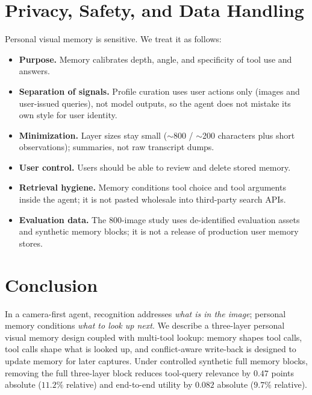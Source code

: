 \documentclass[11pt,a4paper]{article}
\begin{document}
\section{Privacy, Safety, and Data Handling}
\label{sec:privacy}

Personal visual memory is sensitive. We treat it as follows:

\begin{itemize}[leftmargin=*]
    \item \textbf{Purpose.} Memory calibrates depth, angle, and specificity of tool use and answers.
    \item \textbf{Separation of signals.} Profile curation uses user actions only (images and user-issued queries), not model outputs, so the agent does not mistake its own style for user identity.
    \item \textbf{Minimization.} Layer sizes stay small ($\sim$800 / $\sim$200 characters plus short observations); summaries, not raw transcript dumps.
    \item \textbf{User control.} Users should be able to review and delete stored memory.
    \item \textbf{Retrieval hygiene.} Memory conditions tool choice and tool arguments inside the agent; it is not pasted wholesale into third-party search APIs.
    \item \textbf{Evaluation data.} The 800-image study uses de-identified evaluation assets and synthetic memory blocks; it is not a release of production user memory stores.
\end{itemize}

\section{Conclusion}

In a camera-first agent, recognition addresses \emph{what is in the image}; personal memory conditions \emph{what to look up next}. We describe a three-layer personal visual memory design coupled with multi-tool lookup: memory shapes tool calls, tool calls shape what is looked up, and conflict-aware write-back is designed to update memory for later captures. Under controlled synthetic full memory blocks, removing the full three-layer block reduces tool-query relevance by $0.47$ points absolute ($11.2\%$ relative) and end-to-end utility by $0.082$ absolute ($9.7\%$ relative).
\end{document}
